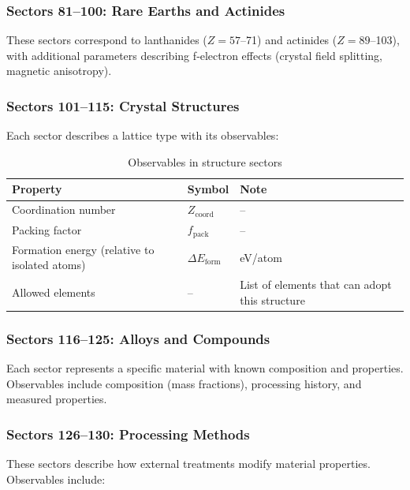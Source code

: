 \documentclass[12pt,a4paper]{article}
\begin{document}
	\subsubsection{Sectors 81–100: Rare Earths and Actinides}
	
	These sectors correspond to lanthanides (\(Z=57\)–71) and actinides (\(Z=89\)–103), with additional parameters describing f‑electron effects (crystal field splitting, magnetic anisotropy).
	
	\subsubsection{Sectors 101–115: Crystal Structures}
	
	Each sector describes a lattice type with its observables:
	
	\begin{table}[htbp]
		\centering
		\caption{Observables in structure sectors}
		\label{tab:struct-obs}
		\begin{tabular}{p{4cm}p{3cm}p{6cm}}
			\toprule
			\textbf{Property} & \textbf{Symbol} & \textbf{Note} \\
			\midrule
			Coordination number & \(Z_{\text{coord}}\) & – \\
			Packing factor & \(f_{\text{pack}}\) & – \\
			Formation energy (relative to isolated atoms) & \(\Delta E_{\text{form}}\) & eV/atom \\
			Allowed elements & – & List of elements that can adopt this structure \\
			\bottomrule
		\end{tabular}
	\end{table}
	
	\subsubsection{Sectors 116–125: Alloys and Compounds}
	
	Each sector represents a specific material with known composition and properties. Observables include composition (mass fractions), processing history, and measured properties.
	
	\subsubsection{Sectors 126–130: Processing Methods}
	
	These sectors describe how external treatments modify material properties. Observables include:
	
\end{document}
